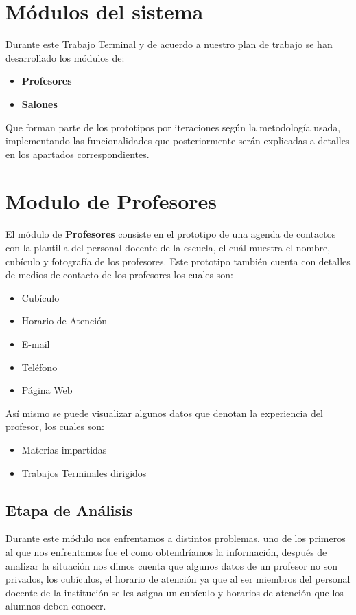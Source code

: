 \section{Módulos del sistema}
	Durante este Trabajo Terminal y de acuerdo a nuestro plan de trabajo se han desarrollado los módulos de:
	\begin{itemize}
		\item \textbf{Profesores}
		\item \textbf{Salones}
	\end{itemize}
Que forman parte de los prototipos por iteraciones según la metodología usada, implementando las funcionalidades que posteriormente serán explicadas a detalles en los apartados correspondientes.
\section{Modulo de Profesores}	El módulo de \textbf{Profesores} consiste en el prototipo de una agenda de contactos con la plantilla del personal docente de la escuela, el cuál muestra el nombre, cubículo y fotografía de los profesores. Este prototipo también cuenta con detalles de medios de contacto de los profesores los cuales son:
	\begin{itemize}
		\item Cubículo
		\item Horario de Atención
		\item E-mail
		\item Teléfono
		\item Página Web
	\end{itemize}
	Así mismo se puede visualizar algunos datos que denotan la experiencia del profesor, los cuales son:
	\begin{itemize}
		\item Materias impartidas
		\item Trabajos Terminales dirigidos
	\end{itemize} 
	\subsection{Etapa de Análisis}
	Durante este módulo nos enfrentamos a distintos problemas, uno de los primeros al que nos enfrentamos fue el como obtendríamos la información, después de analizar la situación nos dimos cuenta que algunos datos de un profesor no son privados, los cubículos, el horario de atención ya que al ser miembros del personal docente de la institución se les asigna un cubículo y horarios de atención que los alumnos deben conocer. \\
	
